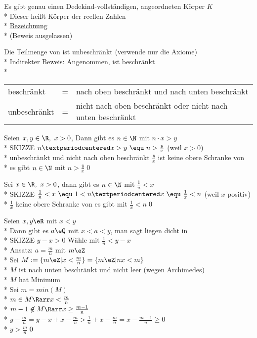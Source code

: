 Es gibt genau einen Dedekind-vollständigen, angeordneten Körper $K$\\*
Dieser heißt Körper der reellen Zahlen\\*
\ul{Bezeichnung} \R\\*
(Beweis ausgelassen)

Die Teilmenge \N{} von \R{} ist unbeschränkt
\bew
(verwende nur die Axiome)\\*
Indirekter Beweis: Angenommen, \N{} ist beschränkt\\*
\begin{tabular}{lcl}
beschränkt &=& nach oben beschränkt und nach unten beschränkt\\*
unbeschränkt &=& nicht nach oben beschränkt oder nicht nach unten beschränkt
\end{tabular}
%
Seien $x,y\in\R,\ x>0$, Dann gibt es $n\in\N$ mit $n·x>y$\\*
SKIZZE %
%
\bew
$n·x>y\ \equ\ n>\frac{y}{x}$ (weil $x>0$)\\*
\N{} unbeschränkt und nicht nach oben beschränkt \Rarr{} $\frac{y}{x}$ ist keine obere Schranke von \N\\*
\Rarr{} es gibt $n\in\N$ mit $n>\frac{y}{x}$\qed

Sei $x\in\R,\ x>0$, dann gibt es $n\in\N$ mit $\frac{1}{n}<x$\\*
SKIZZE %
\bew
$\frac{1}{n}<x\ \equ\ 1<n·x\ \equ\ \frac{1}{x}<n$ (weil $x$ positiv)\\*
$\frac{1}{x}$ keine obere Schranke von \N{} \Rarr{} es gibt \nN{} mit $\frac{1}{x}<n$\qed

Seien $x,y\eR$ mit $x<y$\\*
Dann gibt es $a\eQ$ mit $x<a<y$, man sagt \Q{} liegen dicht in \R\\*
SKIZZE %
\bew
$y-x>0$ Wähle \nN{} mit $\frac{1}{n}<y-x$\\*
Ansatz: $a=\frac{m}{n}$ mit $m\eZ$\\*
Sei $M:=\{m\eZ|x<\frac{m}{n}\}=\{m\eZ|nx<m\}$\\*
$M$ ist nach unten beschränkt und nicht leer (wegen Archimedes)\\*
$M$ hat Minimum\\*
Sei $m=min(M)$\\*
$m\in M \Rarr x<\frac{m}{n}$\\*
$m-1\not\in M \Rarr x\geq\frac{m-1}{n}$\\*
$y-\frac{m}{n} =y-x+x-\frac{m}{n}>\frac{1}{n}+x-\frac{m}{n}=x-\frac{m-1}{n}\geq0$\\*
$y>\frac{m}{n}$\qed

